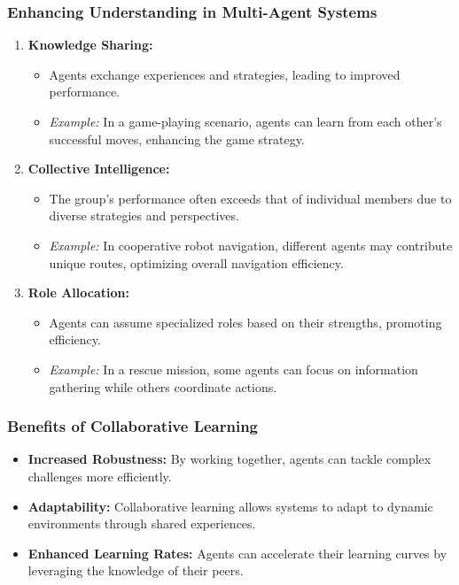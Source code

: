 \documentclass[aspectratio=169]{beamer}
\begin{document}
\begin{frame}[fragile]
    \frametitle{Enhancing Understanding in Multi-Agent Systems}
    \begin{enumerate}
        \item \textbf{Knowledge Sharing:}
        \begin{itemize}
            \item Agents exchange experiences and strategies, leading to improved performance.
            \item \textit{Example:} In a game-playing scenario, agents can learn from each other's successful moves, enhancing the game strategy.
        \end{itemize}
        \item \textbf{Collective Intelligence:}
        \begin{itemize}
            \item The group's performance often exceeds that of individual members due to diverse strategies and perspectives.
            \item \textit{Example:} In cooperative robot navigation, different agents may contribute unique routes, optimizing overall navigation efficiency.
        \end{itemize}
        \item \textbf{Role Allocation:}
        \begin{itemize}
            \item Agents can assume specialized roles based on their strengths, promoting efficiency.
            \item \textit{Example:} In a rescue mission, some agents can focus on information gathering while others coordinate actions.
        \end{itemize}
    \end{enumerate}
\end{frame}

\begin{frame}[fragile]
    \frametitle{Benefits of Collaborative Learning}
    \begin{itemize}
        \item \textbf{Increased Robustness:} By working together, agents can tackle complex challenges more efficiently.
        \item \textbf{Adaptability:} Collaborative learning allows systems to adapt to dynamic environments through shared experiences.
        \item \textbf{Enhanced Learning Rates:} Agents can accelerate their learning curves by leveraging the knowledge of their peers.
    \end{itemize}
\end{frame}
\end{document}
